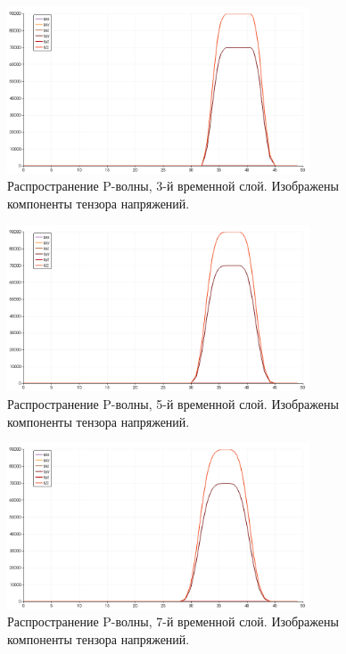 \begin{figure}[htp]
\centering
\includegraphics[width=0.8\textwidth]{png/p-wave-test/s/0003.png}
\caption{Распространение P-волны, 3-й временной слой. Изображены компоненты тензора напряжений.}
\end{figure}

\begin{figure}[htp]
\centering
\includegraphics[width=0.8\textwidth]{png/p-wave-test/s/0005.png}
\caption{Распространение P-волны, 5-й временной слой. Изображены компоненты тензора напряжений.}
\end{figure}

\begin{figure}[htp]
\centering
\includegraphics[width=0.8\textwidth]{png/p-wave-test/s/0007.png}
\caption{Распространение P-волны, 7-й временной слой. Изображены компоненты тензора напряжений.}
\end{figure}

